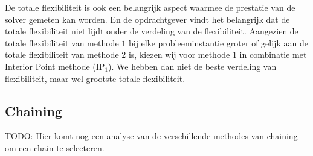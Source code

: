 De totale flexibiliteit is ook een belangrijk aspect waarmee de prestatie van de solver gemeten kan worden. En de opdrachtgever vindt het belangrijk dat de totale flexibiliteit niet lijdt onder de verdeling van de flexibiliteit. Aangezien de totale flexibiliteit van methode $1$ bij elke probleeminstantie groter of gelijk aan de totale flexibiliteit van methode $2$ is, kiezen wij voor methode $1$ in combinatie met Interior Point methode (IP$_1$). We hebben dan niet de beste verdeling van flexibiliteit, maar wel grootste totale flexibiliteit.

\subsection{Chaining}
TODO: Hier komt nog een analyse van de verschillende methodes van chaining om een chain te selecteren. 
